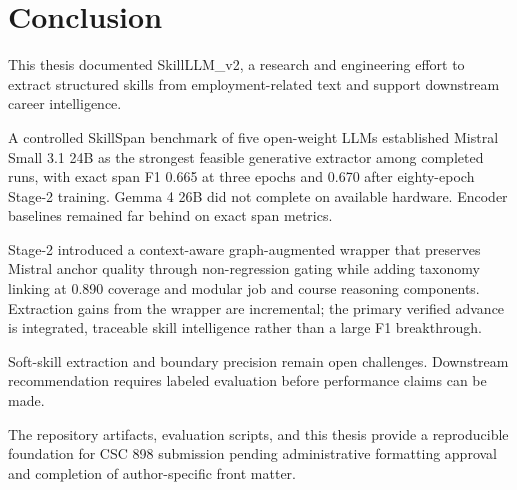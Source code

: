 \chapter{Conclusion}
\label{ch:conclusion}

This thesis documented SkillLLM\_v2, a research and engineering effort to extract structured skills from employment-related text and support downstream career intelligence.

A controlled SkillSpan benchmark of five open-weight LLMs established Mistral Small 3.1 24B as the strongest feasible generative extractor among completed runs, with exact span F1 0.665 at three epochs and 0.670 after eighty-epoch Stage-2 training.
Gemma 4 26B did not complete on available hardware.
Encoder baselines remained far behind on exact span metrics.

Stage-2 introduced a context-aware graph-augmented wrapper that preserves Mistral anchor quality through non-regression gating while adding taxonomy linking at 0.890 coverage and modular job and course reasoning components.
Extraction gains from the wrapper are incremental; the primary verified advance is integrated, traceable skill intelligence rather than a large F1 breakthrough.

Soft-skill extraction and boundary precision remain open challenges.
Downstream recommendation requires labeled evaluation before performance claims can be made.

The repository artifacts, evaluation scripts, and this thesis provide a reproducible foundation for CSC 898 submission pending administrative formatting approval and completion of author-specific front matter.
